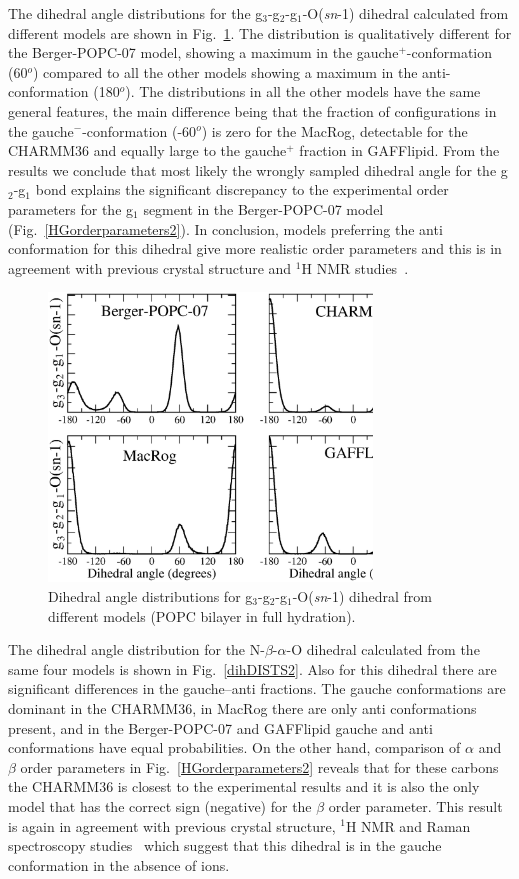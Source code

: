 \documentclass[journal=jpcbfk,manuscript=article]{achemso}
\begin{document}
The dihedral angle distributions for the  g$_3$-g$_2$-g$_1$-O(\textit{sn}-1) dihedral calculated from different models are
shown in Fig.~\ref{dihDISTS}. The distribution is qualitatively different for the Berger-POPC-07 model, showing a maximum in 
the gauche$^+$-conformation (60$^o$) compared to all the other models showing a maximum in the anti-conformation (180$^o$).
The distributions in all the other models have the same general features, the main difference being that the
fraction of configurations in the gauche$^-$-conformation (-60$^o$) is zero for the MacRog, detectable for the CHARMM36 and
equally large to the gauche$^+$ fraction in GAFFlipid. From the results we conclude that most likely the wrongly sampled
dihedral angle for the g$_2$-g$_1$ bond explains the significant discrepancy to the experimental order parameters
for the g$_1$ segment in the Berger-POPC-07 model (Fig.~\ref{HGorderparameters2}). 
In conclusion, models preferring the anti conformation for this dihedral give more realistic order parameters and
this is in agreement with previous crystal structure and $^1$H NMR studies~\cite{hauser80,hauser81,hauser81b,hauser88,pascher92,marsh06}.
\begin{figure}[]
  \centering
  \includegraphics[width=8.6cm]{../Fig/g1-g2_Cdihs2.eps}
  \caption{\label{dihDISTS}
    Dihedral angle distributions for g$_3$-g$_2$-g$_1$-O(\textit{sn}-1) dihedral from different models (POPC bilayer in full hydration).
      } 
\end{figure}

The dihedral angle distribution for the  N-$\beta$-$\alpha$-O dihedral calculated from the same four models is 
shown in Fig.~\ref{dihDISTS2}. Also for this dihedral there are significant differences in the gauche--anti fractions.
The gauche conformations are dominant in the CHARMM36, in MacRog there are only anti conformations present,
and in the Berger-POPC-07 and GAFFlipid gauche and anti conformations have equal probabilities. 
On the other hand, comparison of $\alpha$ and $\beta$ order parameters in Fig.~\ref{HGorderparameters2}
reveals that for these carbons the CHARMM36 is closest to the experimental results and it is also the only model that has the correct
sign (negative) for the $\beta$ order parameter. This result is again in agreement with previous 
crystal structure, $^1$H NMR and Raman spectroscopy studies~\cite{hauser80,hauser81,hauser81b,akutsu81b} which suggest that
this dihedral is in the gauche conformation in the absence of ions.
\end{document}
